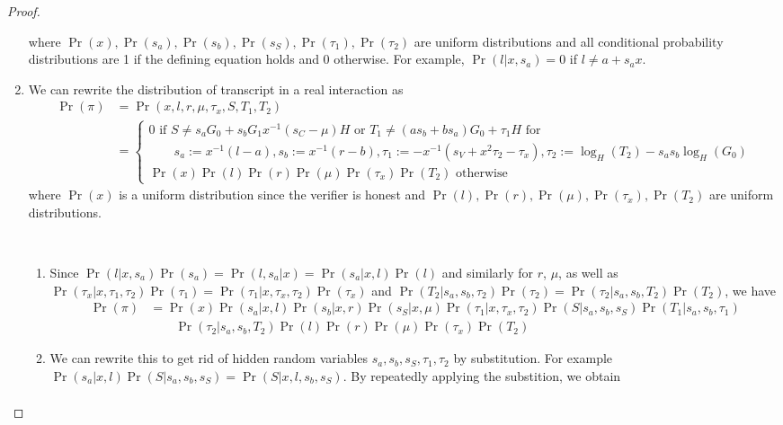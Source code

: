 \begin{proof}
\begin{enumerate}
    where $\Pr(x),\Pr(s_a),\Pr(s_b),\Pr(s_S),\Pr(\tau_1),\Pr(\tau_2)$ are uniform distributions and all conditional probability distributions are 1 if the defining equation holds and 0 otherwise. For example, $\Pr(l|x, s_a) = 0$ if $l\ne a + s_ax$.
   \item We can rewrite the distribution of transcript in a real interaction as
    \begin{align*}
        \Pr(\pi) &= \Pr(x, l, r, \mu, \tau_x, S, T_1, T_2)\\
                        &= \begin{cases} 0 \text{ if } S \ne s_aG_0 + s_bG_1 x^{-1}(s_C - \mu)H \text{ or } T_1 \ne (as_b + bs_a)G_0 + \tau_1H \text{ for }\\ \qquad s_a := x^{-1}(l - a), s_b := x^{-1}(r - b), \tau_1 := - x^{-1}(s_V  + x^2\tau_2 - \tau_x), \tau_2 := \log_H(T_2) - s_as_b\log_H(G_0) \\
                             \Pr(x)\Pr(l)\Pr(r)\Pr(\mu)\Pr(\tau_x)\Pr(T_2) \text{ otherwise}
                             \end{cases}
    \end{align*}
    where $\Pr(x)$ is a uniform distribution since the verifier is honest and $\Pr(l),\Pr(r),\Pr(\mu),\Pr(\tau_x),\Pr(T_2)$ are uniform distributions.
   \begin{innerproof}
     $ $\par
     \begin{enumerate}
     \item Since $\Pr(l|x, s_a)\Pr(s_a) = \Pr(l,s_a|x) = \Pr(s_a|x, l) \Pr(l)$ and similarly for $r$, $\mu$, as well as $\Pr(\tau_x| x, \tau_1, \tau_2)\Pr(\tau_1 ) = \Pr(\tau_1| x, \tau_x, \tau_2)\Pr(\tau_x )$ and $\Pr(T_2| s_a, s_b, \tau_2)\Pr(\tau_2) = \Pr(\tau_2| s_a, s_b, T_2)\Pr(T_2)$,
       we have
       \begin{align*}
      \Pr(\pi) &= \Pr(x) \Pr(s_a|x, l) \Pr(s_b|x, r) \Pr(s_S| x, \mu) \Pr(\tau_1| x, \tau_x, \tau_2) \Pr(S| s_a, s_b, s_S) \Pr(T_1| s_a, s_b, \tau_1)\\
      &\qquad \Pr(\tau_2| s_a, s_b, T_2) \Pr(l)\Pr(r)\Pr(\mu)\Pr(\tau_x )\Pr(T_2)
       \end{align*}
     \item We can rewrite this to get rid of hidden random variables $s_a, s_b, s_S, \tau_1, \tau_2$ by substitution.
       For example $\Pr(s_a|x, l)\Pr(S| s_a, s_b, s_S) = \Pr(S| x, l, s_b, s_S)$.
       By repeatedly applying the substition, we obtain
       \begin{align*}

\end{align*}
\end{enumerate}
\end{innerproof}
\end{enumerate}
\end{proof}
